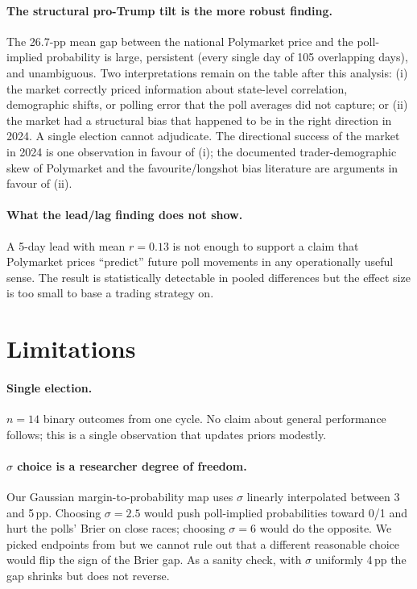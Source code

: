 \documentclass{article}
\begin{document}
\paragraph{The structural pro-Trump tilt is the more robust finding.}
The 26.7-pp mean gap between the national Polymarket price and the
poll-implied probability is large, persistent (every single day of 105
overlapping days), and unambiguous. Two interpretations remain on the
table after this analysis: (i) the market correctly priced information
about state-level correlation, demographic shifts, or polling error
that the poll averages did not capture; or (ii) the market had a
structural bias that happened to be in the right direction in 2024. A
single election cannot adjudicate. The directional success of the market
in 2024 is one observation in favour of (i); the documented
trader-demographic skew of Polymarket and the favourite/longshot bias
literature \citep{page2013well} are arguments in favour of (ii).

\paragraph{What the lead/lag finding does not show.}
A 5-day lead with mean $r = 0.13$ is not enough to support a claim that
Polymarket prices ``predict'' future poll movements in any
operationally useful sense. The result is statistically detectable in
pooled differences but the effect size is too small to base a trading
strategy on.

\section{Limitations}
\label{sec:limitations}

\paragraph{Single election.}
$n = 14$ binary outcomes from one cycle. No claim about general
performance follows; this is a single observation that updates priors
modestly.

\paragraph{$\sigma$ choice is a researcher degree of freedom.}
Our Gaussian margin-to-probability map uses $\sigma$ linearly
interpolated between 3 and 5\,pp. Choosing $\sigma = 2.5$ would push
poll-implied probabilities toward 0/1 and hurt the polls' Brier on close
races; choosing $\sigma = 6$ would do the opposite. We picked endpoints
from \citet{heidemanns2020updated} but we cannot rule out that a
different reasonable choice would flip the sign of the Brier gap. As a
sanity check, with $\sigma$ uniformly 4\,pp the gap shrinks but does not
reverse.
\end{document}
